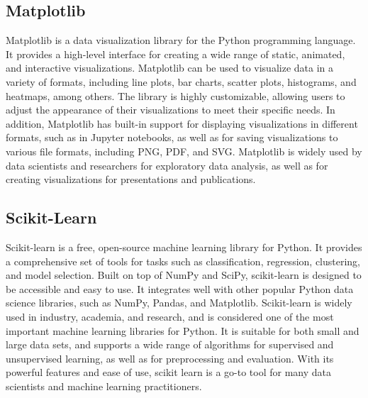 \subsection{Matplotlib}
Matplotlib is a data visualization library for the Python programming language. It 
provides a high-level interface for creating a wide range of static, animated, and
interactive visualizations. Matplotlib can be used to visualize data in a variety of 
formats, including line plots, bar charts, scatter plots, histograms, and heatmaps, among 
others. The library is highly customizable, allowing users to adjust the appearance of 
their visualizations to meet their specific needs. In addition, Matplotlib has built-in 
support for displaying visualizations in different formats, such as in Jupyter notebooks, 
as well as for saving visualizations to various file formats, including PNG, PDF, and 
SVG. Matplotlib is widely used by data scientists and researchers for exploratory data 
analysis, as well as for creating visualizations for presentations and publications.
\subsection{Scikit-Learn}
Scikit-learn is a free, open-source machine learning library for Python. It provides a 
comprehensive set of tools for tasks such as classification, regression, clustering, and 
model selection. Built on top of NumPy and SciPy, scikit-learn is designed to be 
accessible and easy to use. It integrates well with other popular Python data science 
libraries, such as NumPy, Pandas, and Matplotlib. Scikit-learn is widely used in 
industry, academia, and research, and is considered one of the most important machine 
learning libraries for Python. It is suitable for both small and large data sets, and 
supports a wide range of algorithms for supervised and unsupervised learning, as well 
as for preprocessing and evaluation. With its powerful features and ease of use, scikit learn is a go-to tool for many data scientists and machine learning practitioners.
